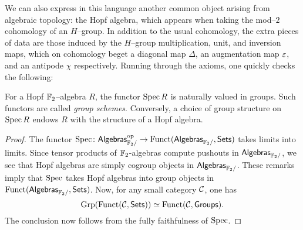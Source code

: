 We can also express in this language another common object arising from algebraic topology: the Hopf algebra, which appears when taking the mod--$2$ cohomology of an $H$--group.  In addition to the usual cohomology, the extra pieces of data are those induced by the $H$--group multiplication, unit, and inversion maps, which on cohomology beget a diagonal map $\Delta$, an augmentation map $\varepsilon$, and an antipode $\chi$ respectively.  Running through the axioms, one quickly checks the following:
\begin{lemma}
For a Hopf $\mathbb F_2$--algebra $R$, the functor $\operatorname{Spec} R$ is naturally valued in groups.  Such functors are called \textit{group schemes}.  Conversely, a choice of group structure on $\operatorname{Spec} R$ endows $R$ with the structure of a Hopf algebra.
\end{lemma}
\begin{proof}
The functor $\operatorname{Spec} \colon \mathsf{Algebras}_{\mathbb F_2 /}^{\mathrm{op}} \to \mathrm{Funct}(\mathsf{Algebras}_{\mathbb F_2 /}, \mathsf{Sets})$ takes limits into limits.
Since tensor products of $\mathbb F_2$-algebras compute pushouts in $\mathsf{Algebras}_{\mathbb F_2 /}$, we see that Hopf algebras are simply cogroup objects in $\mathsf{Algebras}_{\mathbb F_2 /}$.
These remarks imply that $\operatorname{Spec}$ takes Hopf algebras into group objects in $\mathrm{Funct}(\mathsf{Algebras}_{\mathbb F_2 /}, \mathsf{Sets})$.
Now, for any small category $\cal{C}$, one has
\[ \mathrm{Grp}( \mathrm{Funct}(\cal{C}, \mathsf{Sets}) ) \simeq \mathrm{Funct}(\cal{C}, \mathsf{Groups}). \]
The conclusion now follows from the fully faithfulness of $\operatorname{Spec}$.
\end{proof}

